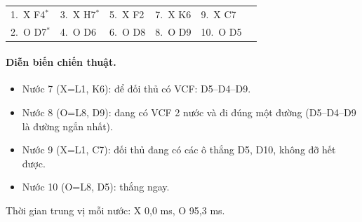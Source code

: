 {\footnotesize\linespread{1}\selectfont
\noindent\begin{tabularx}{\linewidth}{*{6}{X}}
\toprule
1.~X F4$^\ast$ & 3.~X H7$^\ast$ & 5.~X F2 & 7.~X K6 & 9.~X C7 &  \\
2.~O D7$^\ast$ & 4.~O D6 & 6.~O D8 & 8.~O D9 & 10.~O D5 &  \\
\bottomrule
\end{tabularx}\par}
\paragraph{Diễn biến chiến thuật.}
\begin{itemize}\small
\setlength{\itemsep}{0pt}
  \item Nước 7 (X=L1, K6): để đối thủ có VCF: D5--D4--D9.
  \item Nước 8 (O=L8, D9): đang có VCF 2 nước và đi đúng một đường (D5--D4--D9 là đường ngắn nhất).
  \item Nước 9 (X=L1, C7): đối thủ đang có các ô thắng D5, D10, không đỡ hết được.
  \item Nước 10 (O=L8, D5): thắng ngay.
\end{itemize}
Thời gian trung vị mỗi nước: X 0,0 ms, O 95,3 ms.
\clearpage

